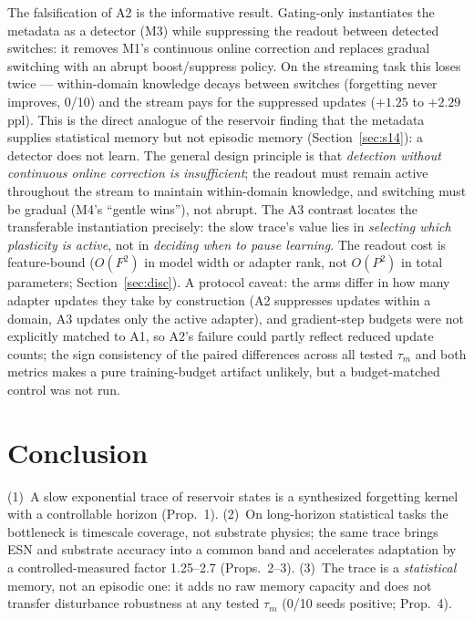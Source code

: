 \documentclass[preprint,12pt]{elsarticle}
\begin{document}
The falsification of A2 is the informative result. Gating-only
instantiates the metadata as a detector (M3) while suppressing the
readout between detected switches: it removes M1's continuous online
correction and replaces gradual switching with an abrupt boost/suppress
policy. On the streaming task this loses twice --- within-domain
knowledge decays between switches (forgetting never improves, 0/10) and
the stream pays for the suppressed updates ($+1.25$ to $+2.29$ ppl).
This is the direct analogue of the reservoir finding that the metadata
supplies statistical memory but not episodic memory
(Section~\ref{sec:s14}): a detector does not learn. The general design
principle is that \emph{detection without continuous online correction
is insufficient}; the readout must remain active throughout the stream
to maintain within-domain knowledge, and switching must be gradual
(M4's ``gentle wins''), not abrupt. The A3 contrast locates the
transferable instantiation precisely: the slow trace's value lies in
\emph{selecting which plasticity is active}, not in \emph{deciding when
to pause learning}. The readout cost is feature-bound ($O(F^2)$ in model
width or adapter rank, not $O(P^2)$ in total parameters;
Section~\ref{sec:disc}). A protocol caveat: the arms differ in how many
adapter updates they take by construction (A2 suppresses updates within
a domain, A3 updates only the active adapter), and gradient-step budgets
were not explicitly matched to A1, so A2's failure could partly reflect
reduced update counts; the sign consistency of the paired differences
across all tested $\tau_m$ and both metrics makes a pure training-budget
artifact unlikely, but a budget-matched control was not run.

\section{Conclusion}
\label{sec:concl}

(1)~A slow exponential trace of reservoir states is a synthesized
forgetting kernel with a controllable horizon (Prop.~1). (2)~On
long-horizon statistical tasks the bottleneck is timescale coverage, not
substrate physics; the same trace brings ESN and substrate accuracy into
a common band and
accelerates adaptation by a controlled-measured factor 1.25--2.7
(Props.~2--3). (3)~The trace is a \emph{statistical} memory, not an
episodic one: it adds no raw memory capacity and does not transfer
disturbance robustness at any tested $\tau_m$ (0/10 seeds positive; Prop.~4).
\end{document}
